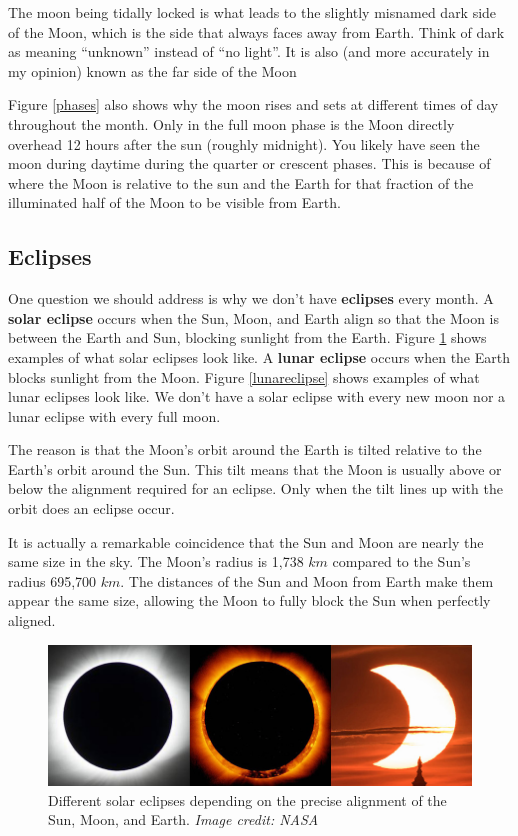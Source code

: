 \documentclass[12pt]{book}
\begin{document}
The moon being tidally locked is what leads to the slightly misnamed dark side of the Moon, which is the side that always faces away from Earth. Think of dark as meaning ``unknown'' instead of ``no light''. It is also (and more accurately in my opinion) known as the far side of the Moon

Figure \ref{phases} also shows why the moon rises and sets at different times of day throughout the month. Only in the full moon phase is the Moon directly overhead 12 hours after the sun (roughly midnight). You likely have seen the moon during daytime during the quarter or crescent phases. This is because of where the Moon is relative to the sun and the Earth for that fraction of the illuminated half of the Moon to be visible from Earth.

\subsection{Eclipses}

One question we should address is why we don't have \textbf{eclipses} every month. A \textbf{solar eclipse} occurs when the Sun, Moon, and Earth align so that the Moon is between the Earth and Sun, blocking sunlight from the Earth. Figure \ref{solareclipse} shows examples of what solar eclipses look like. A \textbf{lunar eclipse} occurs when the Earth blocks sunlight from the Moon. Figure \ref{lunareclipse} shows examples of what lunar eclipses look like. We don't have a solar eclipse with every new moon nor a lunar eclipse with every full moon.

The reason is that the Moon's orbit around the Earth is tilted relative to the Earth's orbit around the Sun. This tilt means that the Moon is usually above or below the alignment required for an eclipse. Only when the tilt lines up with the orbit does an eclipse occur. 

It is actually a remarkable coincidence that the Sun and Moon are nearly the same size in the sky. The Moon's radius is 1,738 $km$ compared to the Sun's radius 695,700 $km$. The distances of the Sun and Moon from Earth make them appear the same size, allowing the Moon to fully block the Sun when perfectly aligned.

\begin{figure}[t]
\centering
\includegraphics[scale=0.4]{solar_eclipse.jpg}
\caption{Different solar eclipses depending on the precise alignment of the Sun, Moon, and Earth. \textit{Image credit: NASA}}
\label{solareclipse}
\end{figure}
\end{document}

